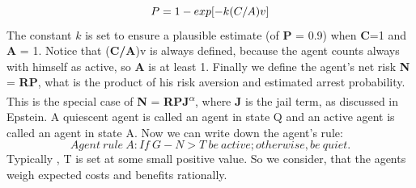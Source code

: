 \documentclass[11pt]{article}
\begin{document}
\begin{equation}
P=1-exp[-k(C/A){\footnotesize v}]
\end{equation}
The constant $k$ is set to ensure a plausible estimate (of \textbf{P} = 0.9) when \textbf{C}=1 and \textbf{A} = 1. Notice that (\textbf{C/A}){\footnotesize v} is always defined, because the agent counts always with himself as active, so  \textbf{A} is at least 1.
Finally we define the agent's net risk \textbf{N} = \textbf{RP}, what is the product of his risk aversion and estimated arrest probability. This is the special case of \textbf{N} = \textbf{RPJ\textsuperscript{$\alpha$}}, where \textbf{J} is the jail term, as discussed in Epstein.
A quiescent agent is called an agent in state Q and an active agent is called an agent in state A. Now we can write down the agent's rule:
\begin{equation}
Agent~ rule ~A: If~ G - N > T ~ be~ active; otherwise, be~ quiet.
\end{equation}
Typically , T is set at some small positive value.
So we consider, that the agents weigh expected costs and benefits rationally.
\end{document}
